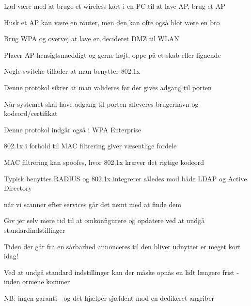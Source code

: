 \documentclass[20pt,landscape,a4paper,footrule]{foils}
\begin{document}

\begin{list1}
\item Lad være med at bruge et wireless-kort i en PC til at lave AP, brug et AP
\item Husk et AP kan være en router, men den kan ofte også blot være en bro
\item Brug WPA og overvej at lave en decideret DMZ til WLAN
\item Placer AP hensigtsmæddigt og gerne højt, oppe på et skab eller lignende
\end{list1}





\begin{list2}
\item Nogle switche tillader at man benytter 802.1x
\item Denne protokol sikrer at man valideres før der gives adgang til porten
\item Når systemet skal have adgang til porten afleveres brugernavn og kodeord/certifikat
\item Denne protokol indgår også i WPA Enterprise
\end{list2}



\begin{list1}
\item 802.1x i forhold til MAC filtrering giver væsentlige fordele
\item MAC filtrering kan spoofes, hvor 802.1x kræver det rigtige kodeord
\item Typisk benyttes RADIUS og 802.1x integrerer således mod både LDAP og Active Directory
\end{list1}





\begin{list1}
\item når vi scanner efter services går det nemt med at finde dem
\item Giv jer selv mere tid til at omkonfigurere og opdatere ved at undgå standardindstillinger
\item Tiden der går fra en sårbarhed annonceres til den
  bliver udnyttet er meget kort idag!
\item Ved at undgå standard indstillinger kan der
  måske opnås en lidt længere frist - inden ormene kommer
\item NB: ingen garanti - og det hjælper sjældent mod en dedikeret angriber
\end{list1}
\end{document}
